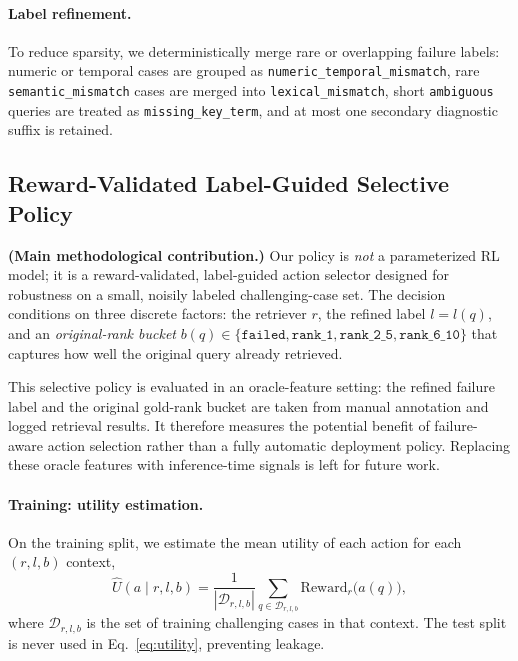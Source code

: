 \documentclass{article}
\begin{document}
\paragraph{Label refinement.}
To reduce sparsity, we deterministically merge rare or overlapping failure
labels: numeric or temporal cases are grouped as
\texttt{numeric\_temporal\_mismatch}, rare \texttt{semantic\_mismatch} cases are
merged into \texttt{lexical\_mismatch}, short \texttt{ambiguous} queries are
treated as \texttt{missing\_key\_term}, and at most one secondary diagnostic
suffix is retained.

\subsection{Reward-Validated Label-Guided Selective Policy}
\label{sec:policy}

\textbf{(Main methodological contribution.)} Our policy is \emph{not} a
parameterized RL model; it is a reward-validated, label-guided action selector
designed for robustness on a small, noisily labeled challenging-case set. The
decision conditions on three discrete factors: the retriever $r$, the refined label
$l = l(q)$, and an \emph{original-rank bucket} $b(q)\in\{\texttt{failed},
\texttt{rank\_1}, \texttt{rank\_2\_5}, \texttt{rank\_6\_10}\}$ that captures how
well the original query already retrieved.

This selective policy is evaluated in an oracle-feature setting: the refined
failure label and the original gold-rank bucket are taken from manual annotation
and logged retrieval results. It therefore measures the potential benefit of
failure-aware action selection rather than a fully automatic deployment policy.
Replacing these oracle features with inference-time signals is left for future
work.

\paragraph{Training: utility estimation.}
On the training split, we estimate the mean utility of each action for each
$(r,l,b)$ context,
\begin{equation}
\widehat{U}(a \mid r, l, b) =
\frac{1}{|\mathcal{D}_{r,l,b}|}
\sum_{q \in \mathcal{D}_{r,l,b}} \mathrm{Reward}_r\big(a(q)\big),
\label{eq:utility}
\end{equation}
where $\mathcal{D}_{r,l,b}$ is the set of training challenging cases in that context.
The test split is never used in Eq.~\eqref{eq:utility}, preventing leakage.
\end{document}

